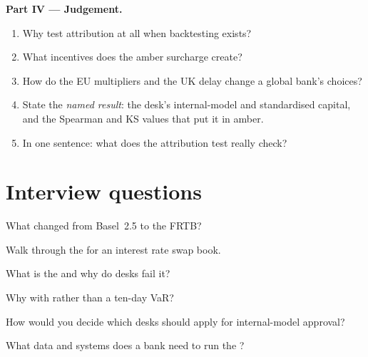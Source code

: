\begin{problem}
\medskip\noindent\textbf{Part IV --- Judgement.}
\begin{enumerate}[resume]
\item Why test attribution at all when backtesting exists?
\item What incentives does the amber surcharge create?
\item How do the EU multipliers and the UK delay change a global bank's choices?
\item State the \emph{named result}: the desk's internal-model and standardised capital, and the
Spearman and KS values that put it in amber.
\item In one sentence: what does the attribution test really check?
\end{enumerate}
\end{problem}

\section{Interview questions}

\begin{interviewq}\label{iq:rc:regulatory-capital-for-trading-books:1}
What changed from Basel~2.5 to the FRTB?
\end{interviewq}

\begin{interviewq}\label{iq:rc:regulatory-capital-for-trading-books:2}
Walk through the  for an interest rate swap book.
\end{interviewq}

\begin{interviewq}\label{iq:rc:regulatory-capital-for-trading-books:3}
What is the  and why do desks fail it?
\end{interviewq}

\begin{interviewq}\label{iq:rc:regulatory-capital-for-trading-books:4}
Why  with  rather than a ten-day VaR?
\end{interviewq}

\begin{interviewq}\label{iq:rc:regulatory-capital-for-trading-books:5}
How would you decide which desks should apply for internal-model approval?
\end{interviewq}

\begin{interviewq}\label{iq:rc:regulatory-capital-for-trading-books:6}
What data and systems does a bank need to run the ?
\end{interviewq}
